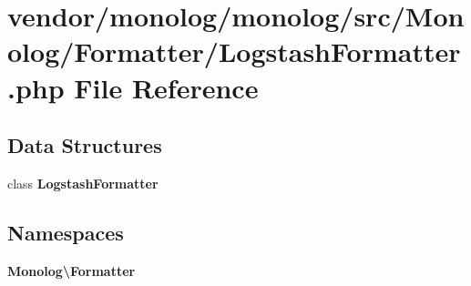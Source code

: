 \section{vendor/monolog/monolog/src/\+Monolog/\+Formatter/\+Logstash\+Formatter.php File Reference}
\label{_logstash_formatter_8php}
\subsection*{Data Structures}
\begin{DoxyCompactItemize}
\item 
class {\bf Logstash\+Formatter}
\end{DoxyCompactItemize}
\subsection*{Namespaces}
\begin{DoxyCompactItemize}
\item 
 {\bf Monolog\textbackslash{}\+Formatter}
\end{DoxyCompactItemize}
